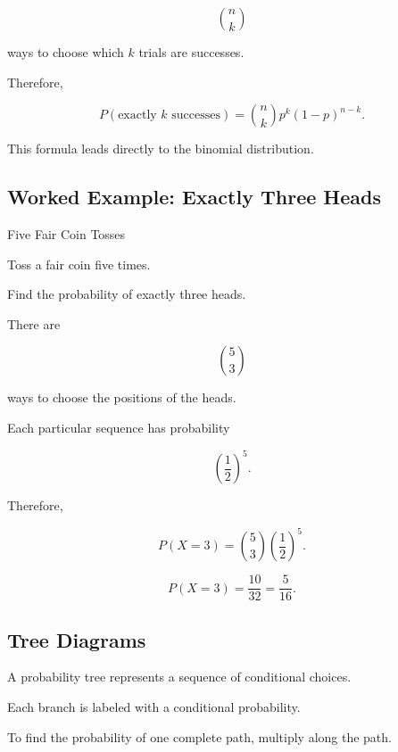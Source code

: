 \[
\binom nk
\]

ways to choose which \(k\) trials are successes.

Therefore,

\[
\boxed{
P(\text{exactly }k\text{ successes})
=
\binom nk
p^k(1-p)^{n-k}.
}
\]

This formula leads directly to the binomial distribution.

\subsection{Worked Example: Exactly Three Heads}
\label{subsec:worked-three-heads}

\begin{workedexamplebox}{Five Fair Coin Tosses}

Toss a fair coin five times.

Find the probability of exactly three heads.

There are

\[
\binom53
\]

ways to choose the positions of the heads.

Each particular sequence has probability

\[
\left(\frac12\right)^5.
\]

Therefore,

\[
P(X=3)
=
\binom53
\left(\frac12\right)^5.
\]

\begin{answerbox}
\[
\boxed{
P(X=3)
=
\frac{10}{32}
=
\frac5{16}.
}
\]
\end{answerbox}

\end{workedexamplebox}

\subsection{Tree Diagrams}
\label{subsec:probability-tree-diagrams}

A probability tree represents a sequence of conditional choices.

Each branch is labeled with a conditional probability.

To find the probability of one complete path, multiply along the path.

